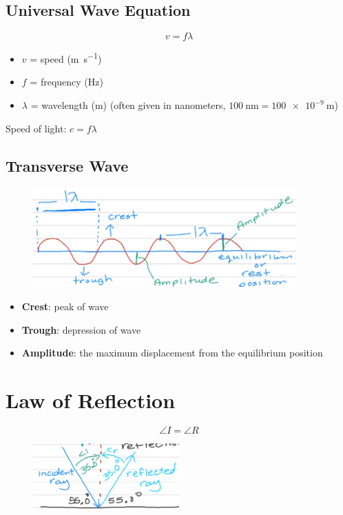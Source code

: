 \documentclass[a4paper,12pt]{article}
\begin{document}
\subsection{Universal Wave Equation}
\Large $$v = f\lambda$$ \normalsize
\begin{itemize}
    \item{$v$ = speed (\si{\m\per\s})}
    \item{$f$ = frequency (\si{\Hz})}
    \item{$\lambda$ = wavelength (\si{\m}) (often given in nanometers, $\SI{100}{\nano\m} = \SI{100e-9}{\m}$)}
\end{itemize}

Speed of light: $c = f\lambda$

\subsection{Transverse Wave}
\begin{figure}[H]
    \centering
    \includegraphics[width=0.9\textwidth]{transverse}
\end{figure}
\begin{itemize}
    \item{\textbf{Crest}: peak of wave}
    \item{\textbf{Trough}: depression of wave}
    \item{\textbf{Amplitude}: the maximum displacement from the equilibrium position}
\end{itemize}

\section{Law of Reflection}

\Large $$\angle{I} = \angle{R}$$ \normalsize

\begin{figure}[H]
    \centering
    \includegraphics[width=0.50\textwidth]{reflect}
\end{figure}
\end{document}
